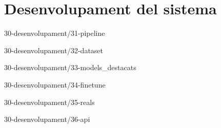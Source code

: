 \chapter{Desenvolupament del sistema}

{30-desenvolupament/31-pipeline}

{30-desenvolupament/32-dataset}

{30-desenvolupament/33-models_destacats}

{30-desenvolupament/34-finetune}

{30-desenvolupament/35-reals}

{30-desenvolupament/36-api}

